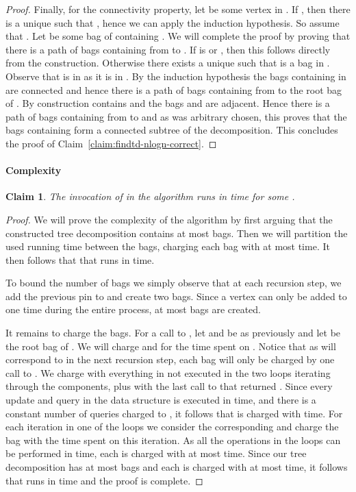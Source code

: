 \documentclass[a4paper,11pt]{article}
\newtheorem{claim}[lemma]{Claim}
\theoremstyle{definition}
\theoremstyle{remark}
\begin{document}
\begin{proof}
Finally, for the connectivity property, let  be some vertex in .  If , then there is a unique  such
  that , hence we can apply the induction hypothesis.  So
  assume that .  Let  be some bag of 
  containing .  We will complete the proof by proving that there is
  a path of bags containing  from  to .  If  is  or
  , then this follows directly from the construction.  Otherwise
  there exists a unique  such that  is a bag in .
  Observe that  is in  as it is in .  By the
  induction hypothesis the bags containing  in  are
  connected and hence there is a path of bags containing  from 
  to the root bag  of .  By construction  contains 
  and the bags  and  are adjacent.  Hence there is a path of
  bags containing  from  to  and as  was arbitrary
  chosen, this proves that the bags containing  form a connected
  subtree of the decomposition.  This concludes the proof of
  Claim~\ref{claim:findtd-nlogn-correct}.
\end{proof}

\paragraph{Complexity}
\begin{claim}
  \label{claim:findtd-nlogn-complexity}
  The invocation of  in the algorithm  runs in
   time for some .
\end{claim}
\begin{proof}
  We will prove the complexity of the algorithm by first arguing that
  the constructed tree decomposition contains at most  bags.  Then
  we will partition the used running time between the bags, charging
  each bag with at most  time.  It then follows
  that that  runs in  time.
  


  To bound the number of bags we simply observe that at each recursion
  step, we add the previous pin to  and create two bags.  Since a
  vertex can only be added to  one time during the entire process,
  at most  bags are created.
  
  \newcommand{\reccall}{\mathcal{C}}
  
  It remains to charge the bags.  For a call  to ,
  let  and  be as previously and let  be the root bag of
  .  We will charge  and  for the time
  spent on .  Notice that as  will correspond to  in
  the next recursion step, each bag will only be charged by one call
  to .  We charge  with everything in  not
  executed in the two loops iterating through the components, plus
  with the last call to  that returned .  Since every
  update and query in the data structure is executed in  time, and there is a constant number of queries charged to
  , it follows that  is charged with 
  time.  For each iteration in one of the loops we consider the
  corresponding  and charge the bag  with the time spent
  on this iteration.  As all the operations in the loops can be
  performed in  time, each  is charged with
  at most  time.  Since our tree decomposition has
  at most  bags and each is charged with at most  time, it follows that  runs in 
  time and the proof is complete.
\end{proof}
\end{document}
